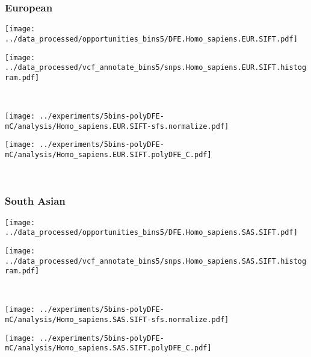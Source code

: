 \subsubsection{European}

\begin{minipage}{0.49\linewidth}
    \texttt{[image: ../data\_processed/opportunities\_bins5/DFE.Homo\_sapiens.EUR.SIFT.pdf]}
\end{minipage}
\begin{minipage}{0.49\linewidth}
    \texttt{[image: ../data\_processed/vcf\_annotate\_bins5/snps.Homo\_sapiens.EUR.SIFT.histogram.pdf]}
\end{minipage}
\\
\begin{minipage}{0.49\linewidth}
    \texttt{[image: ../experiments/5bins-polyDFE-mC/analysis/Homo\_sapiens.EUR.SIFT-sfs.normalize.pdf]}
\end{minipage}
\begin{minipage}{0.49\linewidth}
    \texttt{[image: ../experiments/5bins-polyDFE-mC/analysis/Homo\_sapiens.EUR.SIFT.polyDFE\_C.pdf]}
\end{minipage}
\\

\subsubsection{South Asian}

\begin{minipage}{0.49\linewidth}
    \texttt{[image: ../data\_processed/opportunities\_bins5/DFE.Homo\_sapiens.SAS.SIFT.pdf]}
\end{minipage}
\begin{minipage}{0.49\linewidth}
    \texttt{[image: ../data\_processed/vcf\_annotate\_bins5/snps.Homo\_sapiens.SAS.SIFT.histogram.pdf]}
\end{minipage}
\\
\begin{minipage}{0.49\linewidth}
    \texttt{[image: ../experiments/5bins-polyDFE-mC/analysis/Homo\_sapiens.SAS.SIFT-sfs.normalize.pdf]}
\end{minipage}
\begin{minipage}{0.49\linewidth}
    \texttt{[image: ../experiments/5bins-polyDFE-mC/analysis/Homo\_sapiens.SAS.SIFT.polyDFE\_C.pdf]}
\end{minipage}
\\

